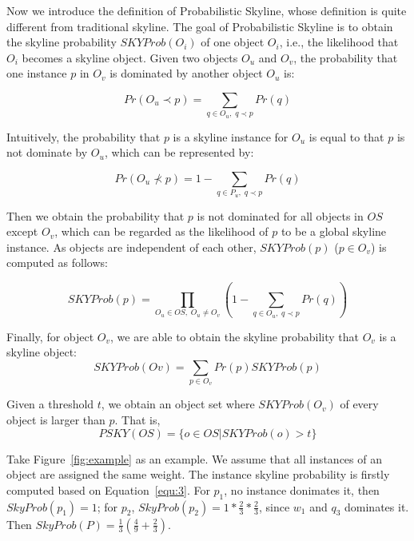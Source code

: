 Now we introduce the definition of Probabilistic Skyline, whose definition is quite different from traditional skyline. The goal of Probabilistic Skyline is to obtain the skyline probability \(SKYProb(O_{i})\) of one object \(O_{i}\), i.e., the likelihood that \(O_{i}\) becomes a skyline object. Given two objects \(O_{u}\) and \(O_{v}\), the probability that one instance \(p\) in \(O_{v}\) is dominated by another object \(O_{u}\) is:

\begin{equation}
\label{equ:1}
Pr(O_{u} \prec p) = \sum_{q \in O_{u}, \; q \prec p}Pr(q)
\end{equation}

Intuitively, the probability that \(p\) is a skyline instance for \(O_{u}\) is equal to that \(p\) is not dominate by \(O_{u}\), which can be represented by:

\begin{equation}
\label{equ:2}
Pr(O_{u} \nprec p) = 1 - \sum_{q \in P_{u}, \; q \prec p}Pr(q)
\end{equation}

Then we obtain the probability that \(p\) is not dominated for all objects in \(OS\) except $O_v$, which can be regarded as the likelihood of  $p$ to be a global skyline instance. As objects are independent of each other, \(SKYProb(p)\) (\( p \in O_{v}\)) is computed as follows:

\begin{equation}
\label{equ:3}
SKYProb(p) = \prod_{O_{u} \in OS, \; O_{u} \ne O_{v}}(1 - \sum_{q \in O_{u}, \; q \prec p}Pr(q))
\end{equation}

Finally, for object \(O_{v}\), we are able to obtain the skyline probability that \(O_{v}\) is a skyline object:
\begin{equation}
\label{equ_final}
SKYProb(O{v}) = \sum_{p \in O_{v}} Pr(p)SKY Prob(p)
\end{equation}

Given a threshold \(t\), we obtain an object set where $SKYProb(O_v)$ of every object is larger than $p$. That is,
\begin{equation}
\label{equ_threshold}
PSKY(OS) = \{ o \in OS|SKYProb(o)>t \}
\end{equation}

Take Figure~\ref{fig:example} as an example. We assume that all instances of an object are assigned the same weight. The instance skyline probability is firstly computed based on Equation~\ref{equ:3}. For $p_1$, no instance donimates it, then $SkyProb(p_1) = 1$; for $p_2$, $SkyProb(p_2) = 1* \frac{2}{3} * \frac{2}{3}$, since $w_1$ and $q_3$ dominates it. Then $SkyProb(P) = \frac{1}{3}( \frac{4}{9} + \frac{2}{3})$.

